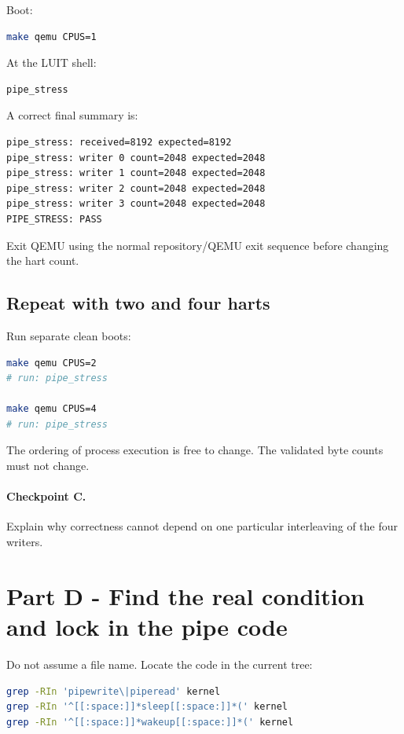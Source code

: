 \documentclass[11pt,a4paper]{article}
\begin{document}
Boot:

\begin{lstlisting}[language=bash]
make qemu CPUS=1
\end{lstlisting}

At the LUIT shell:

\begin{lstlisting}
pipe_stress
\end{lstlisting}

A correct final summary is:

\begin{lstlisting}
pipe_stress: received=8192 expected=8192
pipe_stress: writer 0 count=2048 expected=2048
pipe_stress: writer 1 count=2048 expected=2048
pipe_stress: writer 2 count=2048 expected=2048
pipe_stress: writer 3 count=2048 expected=2048
PIPE_STRESS: PASS
\end{lstlisting}

Exit QEMU using the normal repository/QEMU exit sequence before changing the hart count.

\subsection{Repeat with two and four harts}

Run separate clean boots:

\begin{lstlisting}[language=bash]
make qemu CPUS=2
# run: pipe_stress

make qemu CPUS=4
# run: pipe_stress
\end{lstlisting}

The ordering of process execution is free to change. The validated byte counts must not change.

\paragraph{Checkpoint C.} Explain why correctness cannot depend on one particular interleaving of the four writers.

\section{Part D - Find the real condition and lock in the pipe code}

Do not assume a file name. Locate the code in the current tree:

\begin{lstlisting}[language=bash]
grep -RIn 'pipewrite\|piperead' kernel
grep -RIn '^[[:space:]]*sleep[[:space:]]*(' kernel
grep -RIn '^[[:space:]]*wakeup[[:space:]]*(' kernel
\end{lstlisting}
\end{document}
